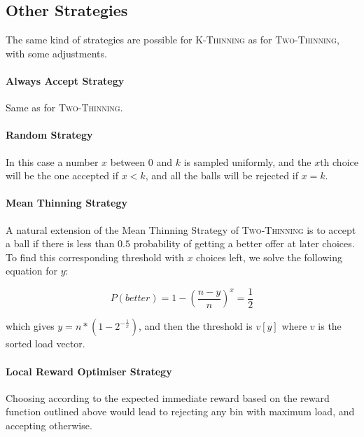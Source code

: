 \subsection{Other Strategies}

The same kind of strategies are possible for \textsc{K-Thinning} as for \textsc{Two-Thinning}, with some adjustments.

\paragraph{Always Accept Strategy} Same as for \textsc{Two-Thinning}.


\paragraph{Random Strategy} In this case a number $x$ between $0$ and $k$ is sampled uniformly, and the $x$th choice will be the one accepted if $x<k$, and all the balls will be rejected if $x=k$.



\paragraph{Mean Thinning Strategy} A natural extension of the Mean Thinning Strategy of \textsc{Two-Thinning} is to accept a ball if there is less than $0.5$ probability of getting a better offer at later choices. To find this corresponding threshold with $x$ choices left, we solve the following equation for $y$:

\begin{equation} \label{meankthinning}
    P(better) = 1 - (\frac{n-y}{n})^x = \frac{1}{2}
\end{equation}

which gives $y = n * (1 - 2^{-\frac{1}{x}})$, and then the threshold is $v[y]$ where $v$ is the sorted load vector. 


\paragraph{Local Reward Optimiser Strategy} Choosing according to the expected immediate reward based on the reward function outlined above would lead to rejecting any bin with maximum load, and accepting otherwise.


